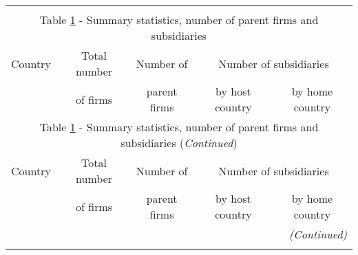 
\begin{longtable}{lcccc}\\
	\label{tab:number of firms}\\
\multicolumn{5}{c}{Table \ref{tab:number of firms} - Summary statistics, number of parent firms and subsidiaries}\\ \hline \hline
Country & Total number & Number of    & \multicolumn{2}{c}{Number of subsidiaries} \\ \cline{4-5} 
& of firms     & parent firms & by host country      & by home country  \\ 

\hline \endfirsthead

\multicolumn{5}{c}{Table \ref{tab:number of firms} - Summary statistics, number of parent firms and subsidiaries (\textit{Continued})}\\ \hline \hline
Country & Total number & Number of    & \multicolumn{2}{c}{Number of subsidiaries} \\ \cline{4-5} 
& of firms     & parent firms & by host country      & by home country     \\ \hline \endhead
\hline
\multicolumn{5}{r}{{\textit{(Continued)}}}\\ \endfoot

\endlastfoot
           

\end{longtable}
